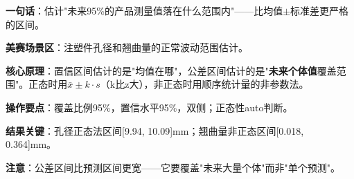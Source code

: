 
\begin{algobrief}
\textbf{一句话}：估计"未来95\%的产品测量值落在什么范围内"——比均值$\pm$标准差更严格的区间。

\textbf{美赛场景区}：注塑件孔径和翘曲量的正常波动范围估计。

\textbf{核心原理}：置信区间估计的是"均值在哪"，公差区间估计的是"\textbf{未来个体值}覆盖范围"。正态时用$\bar{x}\pm k\cdot s$（k比z大），非正态时用顺序统计量的非参数法。

\textbf{操作要点}：覆盖比例95\%，置信水平95\%，双侧；正态性auto判断。

\textbf{结果关键}：孔径正态法区间[9.94, 10.09]mm；翘曲量非正态区间[0.018, 0.364]mm。

\textbf{注意}：公差区间比预测区间更宽——它要覆盖"未来大量个体"而非"单个预测"。
\end{algobrief}
